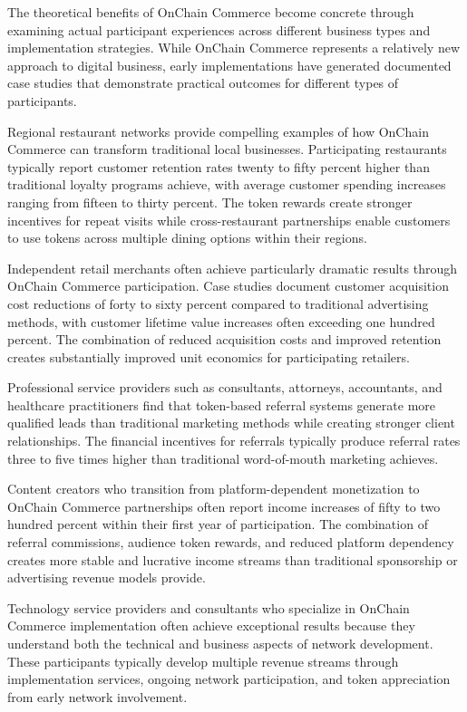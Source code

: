 \documentclass[
  Letterpaper,
]{scrbook}
\begin{document}
The theoretical benefits of OnChain Commerce become concrete through
examining actual participant experiences across different business types
and implementation strategies. While OnChain Commerce represents a
relatively new approach to digital business, early implementations have
generated documented case studies that demonstrate practical outcomes
for different types of participants.

Regional restaurant networks provide compelling examples of how OnChain
Commerce can transform traditional local businesses. Participating
restaurants typically report customer retention rates twenty to fifty
percent higher than traditional loyalty programs achieve, with average
customer spending increases ranging from fifteen to thirty percent. The
token rewards create stronger incentives for repeat visits while
cross-restaurant partnerships enable customers to use tokens across
multiple dining options within their regions.

Independent retail merchants often achieve particularly dramatic results
through OnChain Commerce participation. Case studies document customer
acquisition cost reductions of forty to sixty percent compared to
traditional advertising methods, with customer lifetime value increases
often exceeding one hundred percent. The combination of reduced
acquisition costs and improved retention creates substantially improved
unit economics for participating retailers.

Professional service providers such as consultants, attorneys,
accountants, and healthcare practitioners find that token-based referral
systems generate more qualified leads than traditional marketing methods
while creating stronger client relationships. The financial incentives
for referrals typically produce referral rates three to five times
higher than traditional word-of-mouth marketing achieves.

Content creators who transition from platform-dependent monetization to
OnChain Commerce partnerships often report income increases of fifty to
two hundred percent within their first year of participation. The
combination of referral commissions, audience token rewards, and reduced
platform dependency creates more stable and lucrative income streams
than traditional sponsorship or advertising revenue models provide.

Technology service providers and consultants who specialize in OnChain
Commerce implementation often achieve exceptional results because they
understand both the technical and business aspects of network
development. These participants typically develop multiple revenue
streams through implementation services, ongoing network participation,
and token appreciation from early network involvement.
\end{document}

